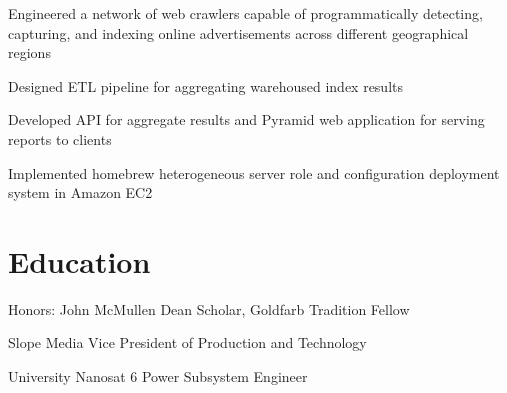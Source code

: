\documentclass[]{resume-openfont}
\begin{document}
    \begin{tightemize}
        \item
            Engineered a network of web crawlers capable of programmatically
            detecting, capturing, and indexing online advertisements across
            different geographical regions
        \item
            Designed ETL pipeline for aggregating warehoused index results
        \item
            Developed API for aggregate results and Pyramid web application for
            serving reports to clients
        \item
            Implemented homebrew heterogeneous server role and configuration
            deployment system in Amazon EC2
    \end{tightemize}

\section{Education}
    \begin{tightemize}
    \item
        Honors: John McMullen Dean Scholar, Goldfarb Tradition Fellow
    \item
        Slope Media Vice President of Production and Technology
    \item
        University Nanosat 6 Power Subsystem Engineer
    \end{tightemize}
\end{document}
